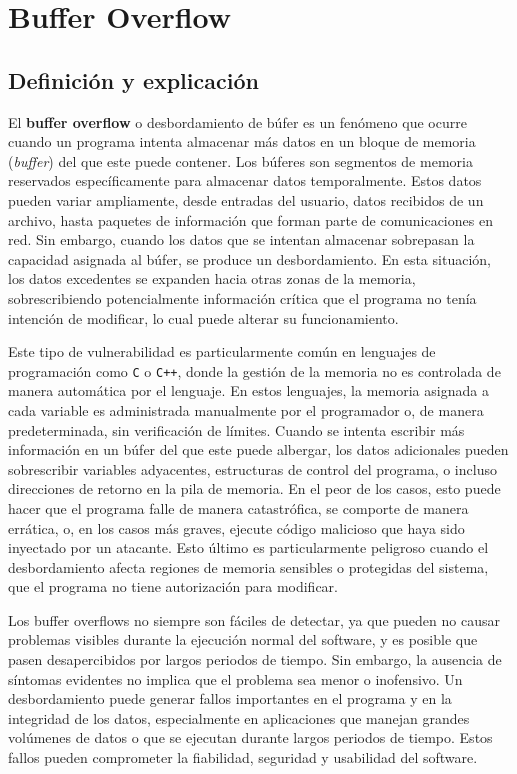 \chapter{Buffer Overflow}

\section{Definición y explicación}
\noindent El \textbf{buffer overflow} o desbordamiento de búfer es un fenómeno que ocurre cuando un programa intenta almacenar más datos en un bloque de memoria (\textit{buffer}) del que este puede contener. Los búferes son segmentos de memoria reservados específicamente para almacenar datos temporalmente. Estos datos pueden variar ampliamente, desde entradas del usuario, datos recibidos de un archivo, hasta paquetes de información que forman parte de comunicaciones en red. Sin embargo, cuando los datos que se intentan almacenar sobrepasan la capacidad asignada al búfer, se produce un desbordamiento. En esta situación, los datos excedentes se expanden hacia otras zonas de la memoria, sobrescribiendo potencialmente información crítica que el programa no tenía intención de modificar, lo cual puede alterar su funcionamiento.

\vspace{0.3cm}
\noindent Este tipo de vulnerabilidad es particularmente común en lenguajes de programación como \texttt{C} o \texttt{C++}, donde la gestión de la memoria no es controlada de manera automática por el lenguaje. En estos lenguajes, la memoria asignada a cada variable es administrada manualmente por el programador o, de manera predeterminada, sin verificación de límites. Cuando se intenta escribir más información en un búfer del que este puede albergar, los datos adicionales pueden sobrescribir variables adyacentes, estructuras de control del programa, o incluso direcciones de retorno en la pila de memoria. En el peor de los casos, esto puede hacer que el programa falle de manera catastrófica, se comporte de manera errática, o, en los casos más graves, ejecute código malicioso que haya sido inyectado por un atacante. Esto último es particularmente peligroso cuando el desbordamiento afecta regiones de memoria sensibles o protegidas del sistema, que el programa no tiene autorización para modificar.

\vspace{0.3cm}
\noindent Los buffer overflows no siempre son fáciles de detectar, ya que pueden no causar problemas visibles durante la ejecución normal del software, y es posible que pasen desapercibidos por largos periodos de tiempo. Sin embargo, la ausencia de síntomas evidentes no implica que el problema sea menor o inofensivo. Un desbordamiento puede generar fallos importantes en el programa y en la integridad de los datos, especialmente en aplicaciones que manejan grandes volúmenes de datos o que se ejecutan durante largos periodos de tiempo. Estos fallos pueden comprometer la fiabilidad, seguridad y usabilidad del software.

